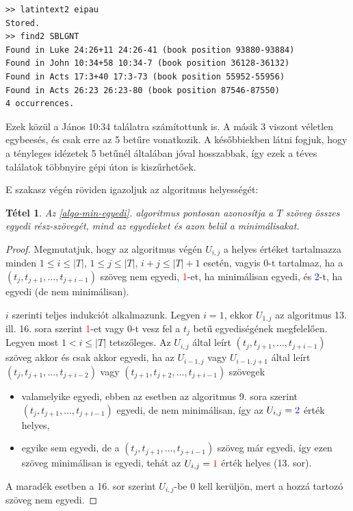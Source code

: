 \documentclass{article}
\newtheorem{theorem}{Tétel}
\begin{document}
\begin{lstlisting}
>> latintext2 eipau
Stored.
>> find2 SBLGNT
Found in Luke 24:26+11 24:26-41 (book position 93880-93884)
Found in John 10:34+58 10:34-7 (book position 36128-36132)
Found in Acts 17:3+40 17:3-73 (book position 55952-55956)
Found in Acts 26:23 26:23-80 (book position 87546-87550)
4 occurrences.
\end{lstlisting}

Ezek közül a János 10:34 találatra számítottunk is. A másik 3 viszont véletlen egybeesés,
és csak erre az 5 betűre vonatkozik.
A későbbiekben látni fogjuk, hogy a tényleges idézetek 5 betűnél általában jóval hosszabbak,
így ezek a téves találatok többnyire gépi úton is kiszűrhetőek.

E szakasz végén röviden igazoljuk az algoritmus helyességét:
\begin{theorem}
Az \ref{algo-min-egyedi}. algoritmus pontosan azonosítja a $T$ szöveg összes egyedi rész-szövegét,
mind az egyedieket és azon belül a minimálisakat.
\end{theorem}
\begin{proof}
Megmutatjuk, hogy az algoritmus végén $U_{i,j}$ a helyes értéket
tartalmazza minden $1\leq i\leq |T|$, $1\leq j\leq |T|$, $i+j\leq |T|+1$ esetén,
vagyis 0-t tartalmaz, ha a $(t_j,t_{j+1},\ldots,t_{j+i-1})$ szöveg nem egyedi,
\textcolor{red}{1}-et, ha minimálisan egyedi, és \textcolor{blue}{2}-t, ha egyedi (de nem minimálisan).

$i$ szerinti teljes indukciót alkalmazunk. Legyen $i=1$, ekkor $U_{1,j}$ az algoritmus
13. ill. 16. sora szerint \textcolor{red}{1}-et vagy 0-t vesz fel a $t_j$ betű egyediségének
megfelelően. Legyen most $1<i\leq |T|$ tetszőleges. Az $U_{i,j}$ által leírt
$(t_j,t_{j+1},\ldots,t_{j+i-1})$ szöveg akkor és csak akkor
egyedi, ha az $U_{i-1,j}$ vagy $U_{i-1,j+1}$ által leírt
$(t_j,t_{j+1},\ldots,t_{j+i-2})$ vagy $(t_{j+1},t_{j+2},\ldots,t_{j+i-1})$
szövegek
\begin{itemize}
\item valamelyike egyedi, ebben az esetben az algoritmus 9. sora szerint
$(t_j,t_{j+1},\ldots,t_{j+i-1})$ egyedi, de nem minimálisan, így
az $U_{i,j}=\textcolor{blue}{2}$ érték helyes,
\item egyike sem egyedi, de a $(t_j,t_{j+1},\ldots,t_{j+i-1})$ szöveg már egyedi,
így ezen szöveg minimálisan is egyedi, tehát az $U_{i,j}=\textcolor{red}{1}$
érték helyes (13. sor).
\end{itemize}
A maradék esetben a 16. sor szerint $U_{i,j}$-be 0 kell kerüljön, mert a
hozzá tartozó szöveg nem egyedi.
\end{proof}
\end{document}
